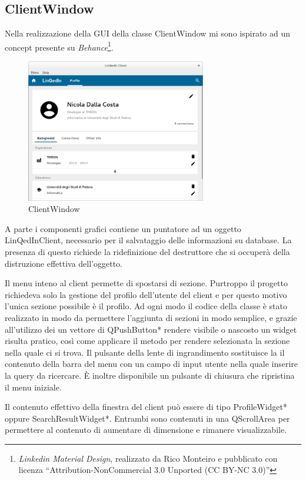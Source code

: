 \documentclass[a4paper]{article}
\begin{document}
\subsection*{ClientWindow}
Nella realizzazione della GUI della classe ClientWindow mi sono ispirato ad un concept presente su \textit{Behance}\footnote{\textit{Linkedin Material Design}, realizzato da Rico Monteiro e pubblicato con licenza ``Attribution-NonCommercial 3.0 Unported (CC BY-NC 3.0)''}.

\begin{figure}[!ht]
\centering
\caption{ClientWindow}
\includegraphics[width=0.7\textwidth]{ClientWindow.png}
\end{figure}

A parte i componenti grafici contiene un puntatore ad un oggetto LinQedInClient, necessario per il salvataggio delle informazioni su database. La presenza di questo richiede la ridefinizione del destruttore che si occuperà della distruzione effettiva dell'oggetto.

Il menu inteno al client permette di spostarsi di sezione. Purtroppo il progetto richiedeva solo la gestione del profilo dell'utente del client e per questo motivo l'unica sezione possibile è il profilo. Ad ogni modo il codice della classe è stato realizzato in modo da permettere l'aggiunta di sezioni in modo semplice, e grazie all'utilizzo dei un vettore di QPushButton* rendere visibile o nascosto un widget risulta pratico, così come applicare il metodo per rendere selezionata la sezione nella quale ci si trova. Il pulsante della lente di ingrandimento sostituisce la il contenuto della barra del menu con un campo di input utente nella quale inserire la query da ricercare. È inoltre disponibile un pulsante di chiusura che ripristina il menu iniziale.

Il contenuto effettivo della finestra del client può essere di tipo ProfileWidget* oppure SearchResultWidget*. Entrambi sono contenuti in una QScrollArea per permettere al contenuto di aumentare di dimensione e rimanere visualizzabile.
\end{document}
